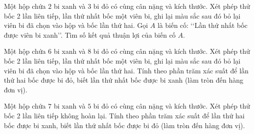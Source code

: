 \begin{ex}[Mức độ 1]%
	Một hộp chứa $2$ bi xanh và $3$ bi đỏ có cùng cân nặng và kích thước. Xét phép thử bốc 2 lần liên tiếp, lần thứ nhất bốc một viên bi, ghi lại màu sắc sau đó bỏ lại viên bi đã chọn vào hộp và bốc lần thứ hai. Gọi $A$ là biến cố: \lq\lq Lần thứ nhất bốc được viên bi xanh\rq\rq. Tìm số kết quả thuận lợi của biến cố $A$.
\end{ex}

\begin{ex}[Mức độ 2]%
	Một hộp chứa $6$ bi xanh và $8$ bi đỏ có cùng cân nặng và kích thước. Xét phép thử bốc 2 lần liên tiếp, lần thứ nhất bốc một viên bi, ghi lại màu sắc sau đó bỏ lại viên bi đã chọn vào hộp và bốc lần thứ hai. Tính theo phần trăm xác suất để lần thứ hai bốc được bi đỏ, biết lần thứ nhất bốc được bi xanh (làm tròn đến hàng đơn vị).
\end{ex}

\begin{ex}[Mức độ 2]%
	Một hộp chứa $7$ bi xanh và $5$ bi đỏ có cùng cân nặng và kích thước. Xét phép thử bốc 2 lần liên tiếp không hoàn lại. Tính theo phần trăm xác suất để lần thứ hai bốc được bi xanh, biết lần thứ nhất bốc được bi đỏ (làm tròn đến hàng đơn vị).
\end{ex}

